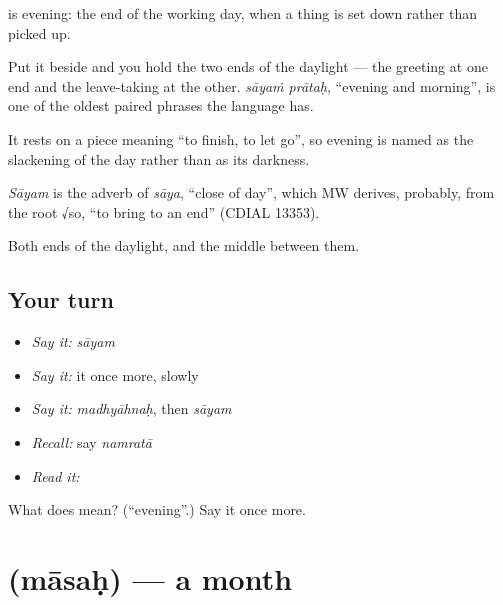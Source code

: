 \textbf{} is evening: the end of the working day, when a thing is set down rather than picked up.

Put it beside  and you hold the two ends of the daylight — the greeting at one end and the leave-taking at the other. \emph{sāyaṁ prātaḥ}, \textquotedblleft{}evening and morning\textquotedblright{}, is one of the oldest paired phrases the language has.

It rests on a piece meaning \textquotedblleft{}to finish, to let go\textquotedblright{}, so evening is named as the slackening of the day rather than as its darkness.

\begin{cousinweb}
\emph{Sāyam} is the adverb of \emph{sāya}, \textquotedblleft{}close of day\textquotedblright{}, which MW derives, probably, from the root √so, \textquotedblleft{}to bring to an end\textquotedblright{} (CDIAL 13353).
\end{cousinweb}

\begin{grammarlens}[title={What you've built}]
Both ends of the daylight, and the middle between them.
\end{grammarlens}

\subsection*{Your turn}
\begin{itemize}
\raggedright
  \item \emph{Say it:} \emph{sāyam}
  \item \emph{Say it:} it once more, slowly
  \item \emph{Say it:} \emph{madhyāhnaḥ}, then \emph{sāyam}
  \item \emph{Recall:} say \emph{namratā}
  \item \emph{Read it:} \textbf{}
\end{itemize}

\begin{tcolorbox}[breakable,colback=teal!4,colframe=teal!35!black,title={Before you move on}]
What does  mean? (\textquotedblleft{}evening\textquotedblright{}.) Say it once more.
\end{tcolorbox}
\section[\texorpdfstring{\sk{मासः} (māsaḥ)}{मासः (māsaḥ)}]{ (māsaḥ) — a month}

